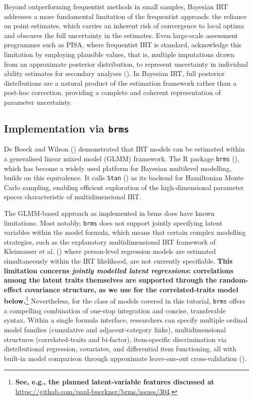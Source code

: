 \documentclass[
  man,
  floatsintext,
  longtable,
  nolmodern,
  notxfonts,
  notimes,
  colorlinks=true,linkcolor=blue,citecolor=blue,urlcolor=blue]{apa7}
\newcommand{\rev}[1]{\textbf{\textcolor{revcol}{#1}}}  %
\begin{document}
Beyond outperforming frequentist methods in small samples, Bayesian IRT
addresses a more fundamental limitation of the frequentist approach: the
reliance on point estimates, which carries an inherent risk of
convergence to local optima and obscures the full uncertainty in the
estimates. Even large-scale assessment programmes such as PISA, where
frequentist IRT is standard, acknowledge this limitation by employing
plausible values, that is, multiple imputations drawn from an
approximate posterior distribution, to represent uncertainty in
individual ability estimates for secondary analyses
(). In Bayesian IRT, full
posterior distributions are a natural product of the estimation
framework rather than a post-hoc correction, providing a complete and
coherent representation of parameter uncertainty.

\subsection{\texorpdfstring{Implementation via
\texttt{brms}}{Implementation via brms}}\label{implementation-via-brms}

De Boeck and Wilson ()
demonstrated that IRT models can be estimated within a generalised
linear mixed model (GLMM) framework. The R package \texttt{brms}
(), which has become a
widely used platform for Bayesian multilevel modelling, builds on this
equivalence. It calls \texttt{Stan}
() as its
backend for Hamiltonian Monte Carlo sampling, enabling efficient
exploration of the high-dimensional parameter spaces characteristic of
multidimensional IRT.

The GLMM-based approach as implemented in brms does have known
limitations. Most notably, \texttt{brms} does not support jointly
specifying latent variables within the model formula, which means that
certain complex modelling strategies, such as the explanatory
multidimensional IRT framework of Kleinsasser et al.
() where person-level
regression models are estimated simultaneously within the IRT
likelihood, are not currently specifiable.
\rev{This limitation concerns \emph{jointly modelled latent regressions}: correlations among the latent traits themselves are supported through the random-effect covariance structure, as we use for the correlated-traits model below.}\footnote{\rev{See, e.g., the planned latent-variable features discussed at}
  \url{https://github.com/paul-buerkner/brms/issues/304}.} Nevertheless,
for the class of models covered in this tutorial, \texttt{brms} offers a
compelling combination of one-stop integration and concise, transferable
syntax. Within a single formula interface, researchers can specify
multiple ordinal model families (cumulative and adjacent-category
links), multidimensional structures (correlated-traits and bi-factor),
item-specific discrimination via distributional regression, covariates,
and differential item functioning, all with built-in model comparison
through approximate leave-one-out cross-validation
().
\end{document}
